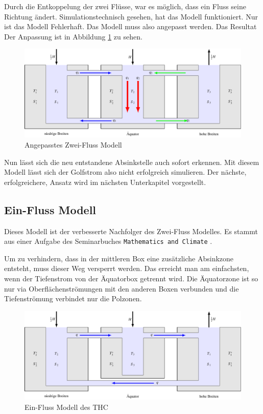 Durch die Entkoppelung der zwei Flüsse, war es möglich, dass ein Fluss seine Richtung ändert.
Simulationstechnisch gesehen, hat das Modell funktioniert. Nur ist das Modell Fehlerhaft. Das Modell muss also angepasst werden. Das Resultat Der Anpassung ist in Abbildung \ref{thermohalin:3b2f-inverted} zu sehen.

\begin{figure}
	\centering
	\includegraphics[width=14cm]{thermohalin/tikz/3b2f-inverted.pdf}
	\caption{Angepasstes Zwei-Fluss Modell}
	\label{thermohalin:3b2f-inverted}
\end{figure}

Nun lässt sich die neu entstandene Absinkstelle auch sofort erkennen. 
Mit diesem Modell lässt sich der Golfstrom also nicht erfolgreich simulieren. 
Der nächste, erfolgreichere, Ansatz wird im nächsten Unterkapitel vorgestellt.

\subsection{Ein-Fluss Modell} 

Dieses Modell ist der verbesserte Nachfolger des Zwei-Fluss Modelles.
Es stammt aus einer Aufgabe des Seminarbuches \texttt{Mathematics and Climate} \cite{skript:kaperengler}.

Um zu verhindern, dass in der mittleren Box eine zusätzliche Absinkzone entsteht, muss dieser Weg versperrt werden. Das erreicht man am einfachsten, wenn der Tiefenstrom von der Äquatorbox getrennt wird. Die Äquatorzone ist so nur via Oberflächenströmungen mit den anderen Boxen verbunden und die Tiefenströmung verbindet nur die Polzonen.


\begin{figure}
	\centering
	\includegraphics[width=14cm]{thermohalin/tikz/3b1f.pdf}
	\caption{Ein-Fluss Modell des THC}
	\label{thermohalin:3b1f}
\end{figure}

